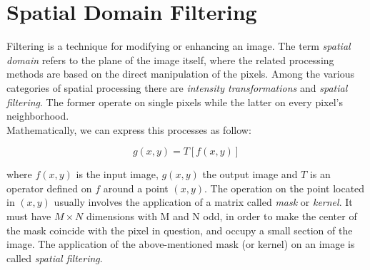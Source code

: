 \documentclass{standalone}
\begin{document}
\section{Spatial Domain Filtering}

Filtering is a technique for modifying or enhancing an image.
The term \textit{spatial domain} refers to the plane of the image itself, where the related processing methods are based on the direct manipulation of the pixels.
Among the various categories of spatial processing there are \textit{intensity transformations} and \textit{spatial filtering}.
The former operate on single pixels while the latter on every pixel's neighborhood.\\
Mathematically, we can express this processes as follow:

\begin{equation}
    g(x,y) = T[f(x,y)] 
\end{equation}

where $f(x, y)$ is the input image, $g(x, y)$ the output image and $T$ is an operator defined on $f$ around a point $(x, y)$.
The operation on the point located in $(x, y)$ usually involves the application of a matrix called \textit{mask} or \textit{kernel}.
It must have  $M \times N$ dimensions with M and N odd, in order to make the center of the mask coincide with the pixel in question, and occupy a small section of the image.
The application of the above-mentioned mask (or kernel) on an image is called \textit{spatial filtering}.  
\end{document}
